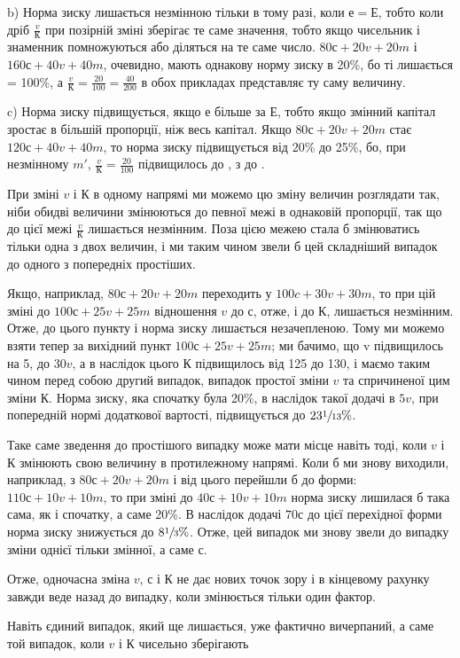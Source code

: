 
b) Норма зиску лишається незмінною тільки в тому разі, коли
$е = Е$, тобто коли дріб $\frac{v}{К}$ при позірній зміні зберігає те саме
значення, тобто якщо чисельник і знаменник помножуються або
діляться на те саме число. $80 с + 20 v + 20 m$ і $160 с + 40 v + 40 m$,
очевидно, мають однакову норму зиску в 20\%, бо ті лишається
= 100\%, а $\frac{v}{К} = \frac{20}{100} = \frac{40}{200}$ в обох прикладах
представляє ту саму величину.

c) Норма зиску підвищується, якщо $е$ більше за $Е$, тобто
якщо змінний капітал зростає в більшій пропорції, ніж весь капітал.
Якщо $80с + 20v + 20m$ стає $120 с + 40 v + 40 m$, то норма
зиску підвищується від 20\% до 25\%, бо, при незмінному $m'$,
$\frac{v}{К} = \frac{20}{100}$ підвищилось до , з 
до .

При зміні $v$ і $К$ в одному напрямі ми можемо цю зміну величин
розглядати так, ніби обидві величини змінюються до певної
межі в однаковій пропорції, так що до цієї межі $\frac{v}{К}$ лишається
незмінним. Поза цією межею стала б змінюватись тільки
одна з двох величин, і ми таким чином звели б цей складніший
випадок до одного з попередніх простіших.

Якщо, наприклад, $80 с + 20 v + 20 m$ переходить у
$100 c + 30 v + 30 m$, то при цій зміні до $100с + 25v + 25m$ відношення
$v$ до $с$, отже, і до $К$, лишається незмінним. Отже, до цього
пункту і норма зиску лишається незачепленою. Тому ми можемо
взяти тепер за вихідний пункт $100 с + 25v + 25m$; ми бачимо,
що v підвищилось на 5, до $30v$, а в наслідок цього $К$ підвищилось
від 125 до 130, і маємо таким чином перед собою другий
випадок, випадок простої зміни $v$ та спричиненої цим
зміни $К$. Норма зиску, яка спочатку була 20\%, в наслідок такої
додачі в $5v$, при попередній нормі додаткової вартості, підвищується
до $23\sfrac{1}{13}\%$.

Таке саме зведення до простішого випадку може мати місце
навіть тоді, коли $v$ і $К$ змінюють свою величину в протилежному
напрямі. Коли б ми знову виходили, наприклад, з
$80с + 20v + 20m$ і від цього перейшли б до форми: $110с + 10v + 10m$, то
при зміні до $40с + 10v + 10m$ норма зиску лишилася б така
сама, як і спочатку, а саме 20\%. В наслідок додачі $70с$ до цієї
перехідної форми норма зиску знижується до $8\sfrac{1}{3}\%$. Отже, цей
випадок ми знову звели до випадку зміни однієї тільки змінної,
а саме $с$.

Отже, одночасна зміна $v$, $с$ і $К$ не дає нових точок зору і в
кінцевому рахунку завжди веде назад до випадку, коли змінюється
тільки один фактор.

Навіть єдиний випадок, який ще лишається, уже фактично
вичерпаний, а саме той випадок, коли $v$ і $К$ чисельно зберігають
\parbreak{}  %
